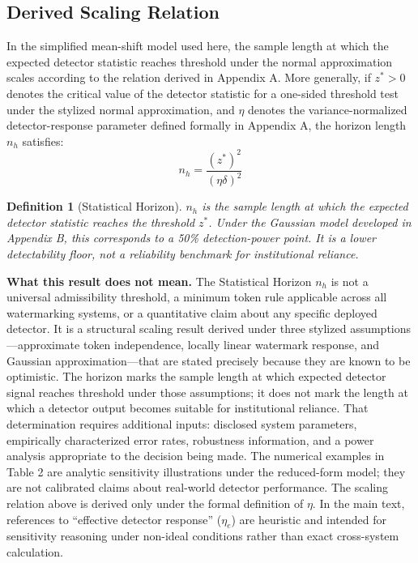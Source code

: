 \documentclass[11pt]{article}
\newtheorem{definition}{Definition}
\begin{document}
\subsection{Derived Scaling Relation}
In the simplified mean-shift model used here, the sample length at which the
expected detector statistic reaches threshold under the normal approximation scales
according to the relation derived in Appendix A. More generally, if $z^* > 0$
denotes the critical value of the detector statistic for a one-sided threshold test
under the stylized normal approximation, and $\eta$
denotes the variance-normalized detector-response parameter defined formally in
Appendix A, the horizon length $n_h$ satisfies:
\begin{equation}
n_h = \frac{(z^*)^2}{(\eta\delta)^2}
\end{equation}
\begin{definition}[Statistical Horizon]
$n_h$ is the sample length at which the expected detector statistic reaches the
threshold $z^*$. Under the Gaussian model developed in Appendix B, this
corresponds to a 50\% detection-power point. It is a lower detectability floor, not
a reliability benchmark for institutional reliance.
\end{definition}
\noindent\textbf{What this result does not mean.} The Statistical Horizon $n_h$ is
not a universal admissibility threshold, a minimum token rule applicable across all
watermarking systems, or a quantitative claim about any specific deployed detector.
It is a structural scaling result derived under three stylized
assumptions---approximate token independence, locally linear watermark response,
and Gaussian approximation---that are stated precisely because they are known to be
optimistic. The horizon marks the sample length at which expected detector signal
reaches threshold under those assumptions; it does not mark the length at which a
detector output becomes suitable for institutional reliance. That determination
requires additional inputs: disclosed system parameters, empirically characterized
error rates, robustness information, and a power analysis appropriate to the
decision being made. The numerical examples in Table 2 are analytic sensitivity
illustrations under the reduced-form model; they are not calibrated claims about
real-world detector performance.
The scaling relation above is derived only under the formal definition of $\eta$.
In the main text, references to ``effective detector response'' ($\eta_{e}$) are
heuristic and intended for sensitivity reasoning under non-ideal conditions rather
than exact cross-system calculation.
\end{document}
